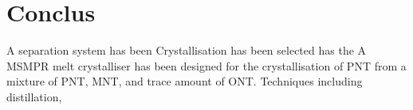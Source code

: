 \section{Conclus}\label{separation conclusions}

A separation system has been Crystallisation has been selected has the A MSMPR melt crystalliser has been designed for the crystallisation of PNT from a mixture of PNT, MNT, and trace amount of ONT. Techniques including distillation, 